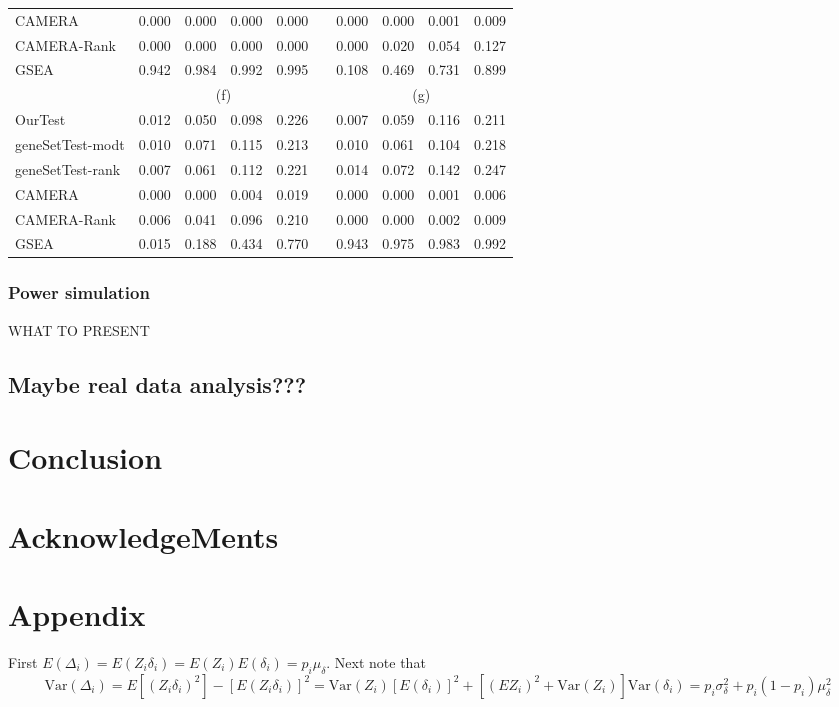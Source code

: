\documentclass[11pt, a4paper]{article}
\begin{document}
\begin{table}[ht]
\begin{tabular}{lrrrrlrrrr}
		CAMERA & 0.000 & 0.000 & 0.000 & 0.000 &  & 0.000 & 0.000 & 0.001 & 0.009 \\ 
		CAMERA-Rank & 0.000 & 0.000 & 0.000 & 0.000 &  & 0.000 & 0.020 & 0.054 & 0.127 \\ 
		GSEA & 0.942 & 0.984 & 0.992 & 0.995 &  & 0.108 & 0.469 & 0.731 & 0.899 \\ 
			 & \multicolumn{4}{c}{(f)} & & \multicolumn{4}{c}{(g)} \\
		OurTest & 0.012 & 0.050 & 0.098 & 0.226 &  & 0.007 & 0.059 & 0.116 & 0.211 \\ 
		geneSetTest-modt & 0.010 & 0.071 & 0.115 & 0.213 &  & 0.010 & 0.061 & 0.104 & 0.218 \\ 
		geneSetTest-rank & 0.007 & 0.061 & 0.112 & 0.221 &  & 0.014 & 0.072 & 0.142 & 0.247 \\ 
		CAMERA & 0.000 & 0.000 & 0.004 & 0.019 &  & 0.000 & 0.000 & 0.001 & 0.006 \\ 
		CAMERA-Rank & 0.006 & 0.041 & 0.096 & 0.210 &  & 0.000 & 0.000 & 0.002 & 0.009 \\ 
		GSEA & 0.015 & 0.188 & 0.434 & 0.770 &  & 0.943 & 0.975 & 0.983 & 0.992 \\ 
		\hline
	\end{tabular}
\end{table}
		\subsubsection{Power simulation}
		WHAT TO PRESENT
		
		\subsection{Maybe real data analysis??? }
	\section{Conclusion}\label{section:conclusion}
	
	\section{AcknowledgeMents}\label{section:acknowledgement}
	
	\section{Appendix}\label{section:appendix}
	
	First $E(\Delta_i) = E(Z_i\delta_i) = E(Z_i)E(\delta_i) = p_i\mu_{\delta}$. Next note that  
	\[\text{Var}(\Delta_i) = E[(Z_i\delta_i)^2]- [E(Z_i\delta_i)]^2 = \text{Var}(Z_i)[E(\delta_i)]^2 + \left[(EZ_i)^2 + \text{Var}(Z_i)\right]\text{Var}(\delta_i) =p_i\sigma_{\delta}^2 + p_i(1-p_i)\mu_{\delta}^2\]
	
\end{document}
